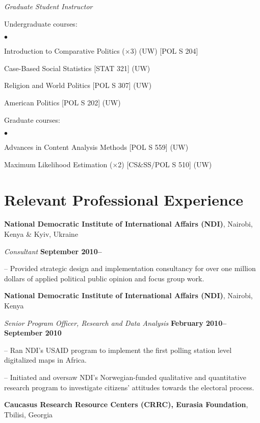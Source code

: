 \documentclass[margin,line]{res}
\newenvironment{list1}{
  \begin{list}{\ding{113}}{%
      \setlength{\itemsep}{0in}
      \setlength{\parsep}{0in} \setlength{\parskip}{0in}
      \setlength{\topsep}{0in} \setlength{\partopsep}{0in} 
      \setlength{\leftmargin}{0.17in}}}{\end{list}}
\newenvironment{list2}{
  \begin{list}{$\bullet$}{%
      \setlength{\itemsep}{0in}
      \setlength{\parsep}{0in} \setlength{\parskip}{0in}
      \setlength{\topsep}{0in} \setlength{\partopsep}{0in} 
      \setlength{\leftmargin}{0.2in}}}{\end{list}}
\begin{document}
{\begin{resume}
{\em Graduate Student Instructor } \\
\vspace{-.1in}
\begin{list1}
 \item[] Undergraduate courses:
   \begin{list2}
   \item[] Introduction to Comparative Politics ($\times$3) (UW)
   [POL S 204]
   \item[] Case-Based Social Statistics [STAT 321] (UW)
   \item[]Religion and World Politics [POL S 307] (UW)
     \item[] American Politics [POL S 202] (UW)
\end{list2}
\item[] Graduate courses:
   \begin{list2}
     \item [] Advances in Content Analysis Methods [POL S 559] (UW)
     \item [] Maximum Likelihood Estimation ($\times$2) [CS\&SS/POL S
       510] (UW)
\end{list2}
\end{list1}

\section{\sc Relevant Professional Experience}
{\bf National Democratic Institute of International Affairs (NDI)},
Nairobi, Kenya \& Kyiv, Ukraine

\vspace{-.3cm}
{\em Consultant} \hfill {\bf
  September 2010--}\\
\begin{list1}
\item[]-- Provided strategic design and implementation consultancy
  for over one million dollars of applied
political public opinion and focus group work.
\end{list1}

{\bf National Democratic Institute of International Affairs (NDI)}, Nairobi, Kenya
\vspace{-.3cm}

{\em Senior Program Officer, Research and Data Analysis} \hfill {\bf
  February 2010--September 2010}\\
\vspace{-.3cm}
\begin{list1} 
\item[]-- Ran NDI's  USAID program to implement the first polling station level
digitalized maps in Africa.
\item[]-- Initiated and oversaw NDI's
Norwegian-funded qualitative and quantitative research program to
investigate citizens' attitudes towards the electoral process.
\end{list1}
{\bf Caucasus Research Resource Centers (CRRC), Eurasia Foundation},
Tbilisi, Georgia


\end{resume}}
\end{document}

